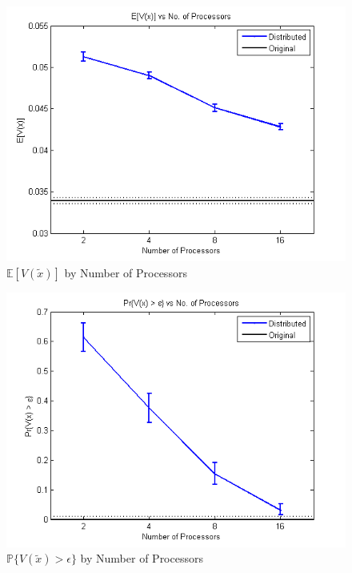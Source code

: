 \documentclass[12pt]{article}
\begin{document}
\begin{figure}[ht]
	\centering
		\includegraphics{../plot/figs/expviolprob_numproc.png}
	\caption{$\mathbb{E}[V(\tilde{x})]$ by Number of Processors}
	\label{fig:expviolprob_numproc}
\end{figure}

\begin{figure}[ht]
	\centering
		\includegraphics{../plot/figs/probviolprobgreateps_numproc.png}
	\caption{$\mathbb{P}\{V(\tilde{x}) > \epsilon \}$ by Number of Processors}
	\label{fig:probviolprobgreateps_numproc}
\end{figure}
\end{document}
